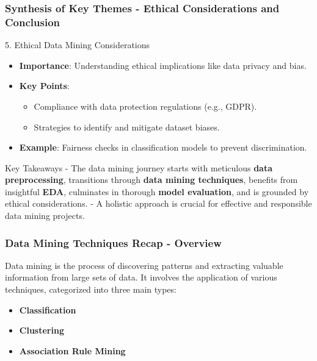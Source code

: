 \documentclass[aspectratio=169]{beamer}
\begin{document}
\begin{frame}[fragile]
    \frametitle{Synthesis of Key Themes - Ethical Considerations and Conclusion}
    \begin{block}{5. Ethical Data Mining Considerations}
        \begin{itemize}
            \item \textbf{Importance}: Understanding ethical implications like data privacy and bias.
            \item \textbf{Key Points}:
                \begin{itemize}
                    \item Compliance with data protection regulations (e.g., GDPR).
                    \item Strategies to identify and mitigate dataset biases.
                \end{itemize}
            \item \textbf{Example}: Fairness checks in classification models to prevent discrimination.
        \end{itemize}
    \end{block}
    
    \begin{block}{Key Takeaways}
        - The data mining journey starts with meticulous \textbf{data preprocessing}, transitions through \textbf{data mining techniques}, benefits from insightful \textbf{EDA}, culminates in thorough \textbf{model evaluation}, and is grounded by ethical considerations.
        - A holistic approach is crucial for effective and responsible data mining projects.
    \end{block}
\end{frame}

\begin{frame}[fragile]
    \frametitle{Data Mining Techniques Recap - Overview}
    Data mining is the process of discovering patterns and extracting valuable information from large sets of data. It involves the application of various techniques, categorized into three main types:
    
    \begin{itemize}
        \item \textbf{Classification}
        \item \textbf{Clustering}
        \item \textbf{Association Rule Mining}
    \end{itemize}
\end{frame}
\end{document}
